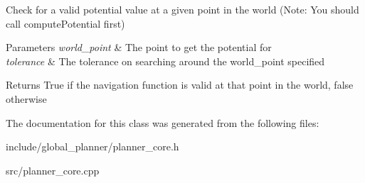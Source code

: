Check for a valid potential value at a given point in the world (Note\+: You should call compute\+Potential first) 


\begin{DoxyParams}{Parameters}
{\em world\+\_\+point} & The point to get the potential for \\
\hline
{\em tolerance} & The tolerance on searching around the world\+\_\+point specified \\
\hline
\end{DoxyParams}
\begin{DoxyReturn}{Returns}
True if the navigation function is valid at that point in the world, false otherwise 
\end{DoxyReturn}


The documentation for this class was generated from the following files\+:\begin{DoxyCompactItemize}
\item 
include/global\+\_\+planner/planner\+\_\+core.\+h\item 
src/planner\+\_\+core.\+cpp\end{DoxyCompactItemize}
